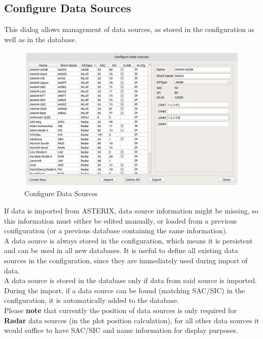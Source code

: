 \subsection{Configure Data Sources}
\label{sec:ui_configure_data_sources}

This dialog allows management of data sources, as stored in the configuration as well as in the database. \\

\begin{figure}[H]
    \hspace*{-2cm}
    \includegraphics[width=18cm]{figures/configure_data_sources.png}
  \caption{Configure Data Sources}
\end{figure}

If data is imported from ASTERIX, data source information might be missing, so this information must either be edited manually, or loaded from a previous configuration (or a previous database containing the same information). \\

A data source is always stored in the configuration, which means it is persistent and can be used in all new databases. 
It is useful to define all existing data sources in the configuration, since they are immediately used during import of data. \\

A data source is stored in the database only if data from said source is imported. 
During the import, if a data source can be found (matching SAC/SIC) in the configuration, it is automatically added to the database. \\

Please \textbf{note} that currently the position of data sources is only required for \textbf{Radar} data sources (in the plot position calculation), 
for all other data sources it would suffice to have SAC/SIC and name information for display purposes.


